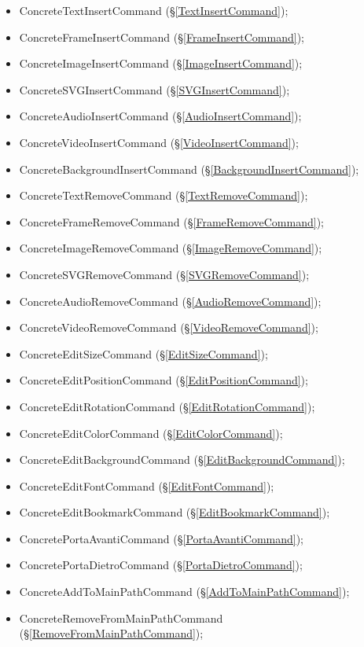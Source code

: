{{{		
		\begin{itemize}
			\item ConcreteTextInsertCommand (\S\ref{TextInsertCommand});
			\item ConcreteFrameInsertCommand (\S\ref{FrameInsertCommand});
			\item ConcreteImageInsertCommand (\S\ref{ImageInsertCommand});
			\item ConcreteSVGInsertCommand (\S\ref{SVGInsertCommand});
			\item ConcreteAudioInsertCommand (\S\ref{AudioInsertCommand});
			\item ConcreteVideoInsertCommand (\S\ref{VideoInsertCommand});
			\item ConcreteBackgroundInsertCommand (\S\ref{BackgroundInsertCommand});
			\item ConcreteTextRemoveCommand (\S\ref{TextRemoveCommand});
			\item ConcreteFrameRemoveCommand (\S\ref{FrameRemoveCommand});
			\item ConcreteImageRemoveCommand (\S\ref{ImageRemoveCommand});
			\item ConcreteSVGRemoveCommand (\S\ref{SVGRemoveCommand});
			\item ConcreteAudioRemoveCommand (\S\ref{AudioRemoveCommand});
			\item ConcreteVideoRemoveCommand (\S\ref{VideoRemoveCommand});
			\item ConcreteEditSizeCommand (\S\ref{EditSizeCommand});
			\item ConcreteEditPositionCommand (\S\ref{EditPositionCommand});
			\item ConcreteEditRotationCommand (\S\ref{EditRotationCommand});
			\item ConcreteEditColorCommand (\S\ref{EditColorCommand});
			\item ConcreteEditBackgroundCommand (\S\ref{EditBackgroundCommand});
			\item ConcreteEditFontCommand (\S\ref{EditFontCommand});
			\item ConcreteEditBookmarkCommand (\S\ref{EditBookmarkCommand});
			\item ConcretePortaAvantiCommand (\S\ref{PortaAvantiCommand});
			\item ConcretePortaDietroCommand (\S\ref{PortaDietroCommand});
			\item ConcreteAddToMainPathCommand (\S\ref{AddToMainPathCommand});
			\item ConcreteRemoveFromMainPathCommand (\S\ref{RemoveFromMainPathCommand});

\end{itemize}}}}
